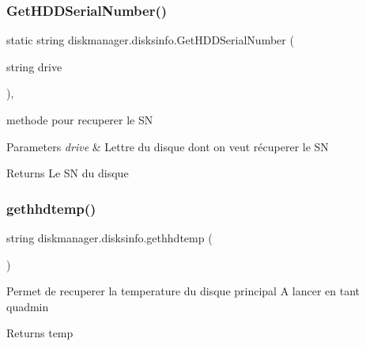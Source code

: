 \subsubsection{\texorpdfstring{Get\+H\+D\+D\+Serial\+Number()}{GetHDDSerialNumber()}}
{\footnotesize\ttfamily static string diskmanager.\+disksinfo.\+Get\+H\+D\+D\+Serial\+Number (\begin{DoxyParamCaption}\item[{string}]{drive }\end{DoxyParamCaption})\hspace{0.3cm}{\ttfamily [static]}, {\ttfamily [private]}}



methode pour recuperer le SN 


\begin{DoxyParams}{Parameters}
{\em drive} & Lettre du disque dont on veut récuperer le SN\\
\hline
\end{DoxyParams}
\begin{DoxyReturn}{Returns}
Le SN du disque
\end{DoxyReturn}
\mbox{\label{classdiskmanager_1_1disksinfo_a452365cea042bea15219919d72c73d0d}} 
\subsubsection{\texorpdfstring{gethhdtemp()}{gethhdtemp()}}
{\footnotesize\ttfamily string diskmanager.\+disksinfo.\+gethhdtemp (\begin{DoxyParamCaption}{ }\end{DoxyParamCaption})}



Permet de recuperer la temperature du disque principal A lancer en tant qu\textquotesingle{}admin 

\begin{DoxyReturn}{Returns}
temp
\end{DoxyReturn}
\mbox{\label{classdiskmanager_1_1disksinfo_ab5229bc8b8c66e1bb2de19aba8f6a130}} 
